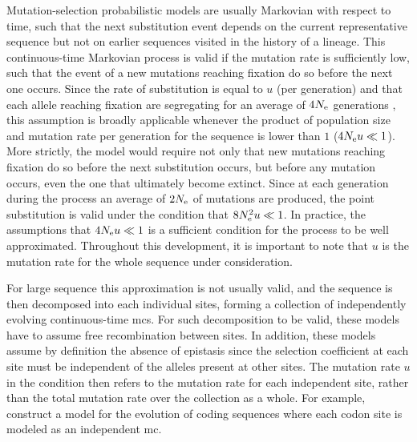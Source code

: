 Mutation-selection probabilistic models are usually Markovian with respect to time, such that the next \gls{substitution} event depends on the current representative sequence but not on earlier sequences visited in the history of a lineage.
This continuous-time Markovian process is valid if the mutation rate is sufficiently low, such that the event of a new mutations reaching fixation do so before the next one occurs. 
Since the rate of \gls{substitution} is equal to $u$ (per generation) and that each \gls{allele} reaching fixation are segregating for an average of $4 N_{\textrm{e}}$ generations \citep{Kimura1969}, this assumption is broadly applicable whenever the product of population size and mutation rate per generation for the sequence is lower than $1$ ($4 N_{\textrm{e}} u \ll 1$).
More strictly, the model would require not only that new mutations reaching fixation do so before the next \gls{substitution} occurs, but before any mutation occurs, even the one that ultimately become extinct.
Since at each generation during the process an average of $2N_{\textrm{e}}$ of mutations are produced, the point \gls{substitution} is valid under the condition that $8N_{\textrm{e}}^2 u \ll 1$.
In practice, the assumptions that $4 N_{\textrm{e}} u \ll 1$ is a sufficient condition for the process to be well approximated.
Throughout this development, it is important to note that $u$ is the mutation rate for the whole sequence under consideration.

For large sequence this approximation is not usually valid, and the sequence is then decomposed into each individual sites, forming a collection of independently evolving continuous-time \glspl{mc}.
For such decomposition to be valid, these models have to assume free \gls{recombination} between sites.
In addition, these models assume by definition the absence of epistasis since the selection coefficient at each site must be independent of the \glspl{allele} present at other sites. 
The mutation rate $u$ in the condition then refers to the mutation rate for each independent site, rather than the total mutation rate over the collection as a whole.
For example, \citet{Halpern1998} construct a model for the evolution of coding sequences where each \gls{codon} site is modeled as an independent \gls{mc}. 

